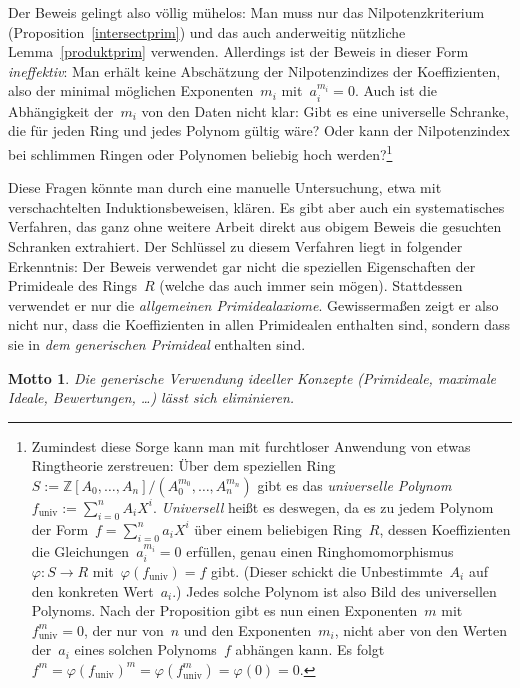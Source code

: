 \documentclass[a4paper,ngerman,12pt]{scrartcl}
\theoremstyle{definition}
\theoremstyle{plain}
\newtheorem{motto}[defn]{Motto}
\theoremstyle{remark}
\newcommand{\ZZ}{\mathbb{Z}}
\renewcommand{\_}{\mathpunct{.}\,}
\newcommand{\?}{\,{:}\,}
\begin{document}
Der Beweis gelingt also völlig mühelos: Man muss nur
das Nilpotenzkriterium (Proposition~\ref{intersectprim}) und das auch anderweitig nützliche
Lemma~\ref{produktprim} verwenden. Allerdings ist der Beweis in dieser Form
\emph{ineffektiv}: Man erhält keine Abschätzung der Nilpotenzindizes der
Koeffizienten, also der minimal möglichen Exponenten~$m_i$ mit~$a_i^{m_i} = 0$.
Auch ist die Abhängigkeit der~$m_i$ von den Daten nicht klar: Gibt es eine
universelle Schranke, die für jeden Ring und jedes Polynom gültig wäre? Oder
kann der Nilpotenzindex bei schlimmen Ringen oder Polynomen beliebig hoch
werden?\footnote{Zumindest diese Sorge kann man mit furchtloser Anwendung von
etwas Ringtheorie zerstreuen: Über dem speziellen Ring~$S :=
\ZZ[A_0,\ldots,A_n]/(A_0^{m_0},\ldots,A_n^{m_n})$ gibt es das \emph{universelle
Polynom} $f_\text{univ} := \sum_{i=0}^n A_i X^i$. \emph{Universell} heißt es
deswegen, da es zu jedem Polynom der Form~$f = \sum_{i=0}^n a_i X^i$ über einem
beliebigen Ring~$R$, dessen Koeffizienten die Gleichungen~$a_i^{m_i} = 0$
erfüllen, genau einen Ringhomomorphismus~$\varphi : S \to R$
mit~$\varphi(f_\text{univ}) = f$ gibt. (Dieser schickt die Unbestimmte~$A_i$
auf den konkreten Wert~$a_i$.) Jedes solche Polynom ist also Bild des
universellen Polynoms. Nach der Proposition gibt es nun einen
Exponenten~$m$ mit~$f_\text{univ}^m = 0$, der nur von~$n$ und den
Exponenten~$m_i$, nicht aber von den Werten der~$a_i$ eines solchen
Polynoms~$f$ abhängen kann. Es folgt~$f^m = \varphi(f_\text{univ})^m =
\varphi(f_\text{univ}^m) = \varphi(0) = 0$.}

Diese Fragen könnte man durch eine manuelle Untersuchung, etwa mit
verschachtelten Induktionsbeweisen, klären. Es gibt aber auch ein
systematisches Verfahren, das ganz ohne weitere Arbeit direkt aus obigem Beweis die
gesuchten Schranken extrahiert. Der Schlüssel zu diesem Verfahren liegt in
folgender Erkenntnis: Der Beweis verwendet gar nicht die speziellen
Eigenschaften der Primideale des Rings~$R$ (welche das auch immer sein mögen).
Stattdessen verwendet er nur die \emph{allgemeinen Primidealaxiome}. Gewissermaßen
zeigt er also nicht nur, dass die Koeffizienten in allen Primidealen enthalten
sind, sondern dass sie in \emph{dem generischen Primideal} enthalten sind.

\begin{motto}Die \emph{generische} Verwendung ideeller Konzepte (Primideale,
maximale Ideale, Bewertungen, \ldots) lässt sich eliminieren.\end{motto}
\end{document}
